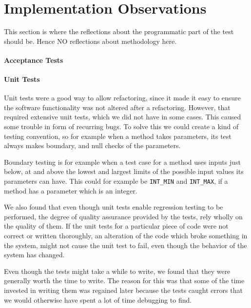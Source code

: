 \section{Implementation Observations}
\label{sec:testImplObservations}
This section is where the reflections about the programmatic part of the test should be. Hence NO reflections about methodology here.

\paragraph{Acceptance Tests}

\paragraph{Unit Tests}
Unit tests were a good way to allow refactoring, since it made it easy to ensure the software functionality was not altered after a refactoring. However, that required extensive unit tests, which we did not have in some cases. This caused some trouble in form of recurring bugs. To solve this we could create a kind of testing convention, so for example when a method takes parameters, its test always makes boundary, and null checks of the parameters.%

Boundary testing is for example when a test case for a method uses inputs just below, at and above the lowest and largest limits of the possible input values its parameters can have. This could for example be \texttt{INT\_MIN} and \texttt{INT\_MAX}, if a method has a parameter which is an integer.

We also found that even though unit tests enable regression testing to be performed, the degree of quality assurance provided by the tests, rely wholly on the quality of them. If the unit tests for a particular piece of code were not correct or written thoroughly, an alteration of the code which broke something in the system, might not cause the unit test to fail, even though the behavior of the system has changed.

Even though the tests might take a while to write, we found that they were generally worth the time to write. The reason for this was that some of the time invested in writing them was regained later because the tests caught errors that we would otherwise have spent a lot of time debugging to find.


